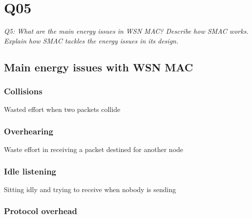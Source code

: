 \chapter{Q05}
\emph{Q5: What are the main energy issues in WSN MAC? Describe how SMAC works.
Explain how SMAC tackles the energy issues in its design.}

\section{Main energy issues with WSN MAC}

\subsection{Collisions}
Wasted effort when two packets collide

\subsection{Overhearing}
Waste effort in receiving a packet destined for another node

\subsection{Idle listening}
Sitting idly and trying to receive when nobody is sending

\subsection{Protocol overhead}

